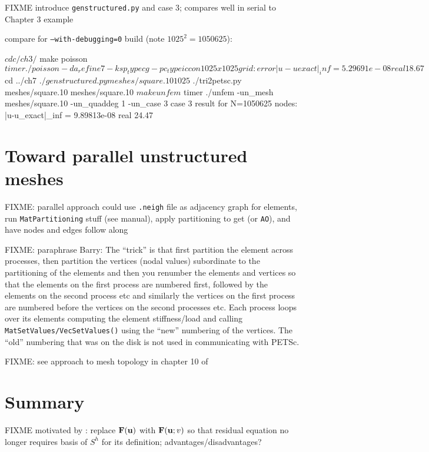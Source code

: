 FIXME introduce \texttt{genstructured.py} and case 3; compares well in serial to Chapter 3 example

compare for \texttt{--with-debugging=0} build (note $1025^2=1050625$):
\begin{cline}
$ cd c/ch3/
$ make poisson
$ timer ./poisson -da_refine 7 -ksp_type cg -pc_type icc
on 1025 x 1025 grid:  error |u-uexact|_inf = 5.29691e-08
real 18.67
$ cd ../ch7
$ ./genstructured.py meshes/square.10 1025
$ ./tri2petsc.py meshes/square.10 meshes/square.10
$ make unfem
$ timer ./unfem -un_mesh meshes/square.10 -un_quaddeg 1 -un_case 3
case 3 result for N=1050625 nodes:  |u-u_exact|_inf = 9.89813e-08
real 24.47
\end{cline}


\section{Toward parallel unstructured meshes}

FIXME: parallel approach could use \Triangle \texttt{.neigh} file as adjacency graph for elements, run \texttt{MatPartitioning} stuff (see manual), apply partitioning to get \pIS (or \texttt{AO}), and have nodes and edges follow along

FIXME: paraphrase Barry: The ``trick'' is that first partition the element across processes, then partition the vertices (nodal values) subordinate to the partitioning of the elements and then you renumber the elements and vertices so that the elements on the first process are numbered first, followed by the elements on the second process etc and similarly the vertices on the first process are numbered before the vertices on the second processes etc.  Each process loops over its elements computing the element stiffness/load and calling \texttt{MatSetValues/VecSetValues()} using the ``new'' numbering of the vertices.  The ``old'' numbering that was on the disk is not used in communicating with PETSc.

FIXME: see approach to mesh topology in chapter 10 of \citep{Loggetal2012}


\section{Summary}

FIXME motivated by \citep{Loggetal2012}: replace $\mathbf{F}(\mathbf{u})$ with $\mathbf{F}(\mathbf{u};v)$ so that residual equation no longer requires basis of $S^h$ for its definition; advantages/disadvantages?


